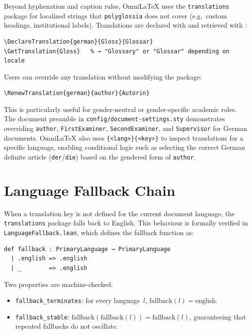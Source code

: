 Beyond hyphenation and caption rules, OmniLaTeX uses the \texttt{translations}
package for localized strings that \texttt{polyglossia} does not cover
(e.g.\ custom headings, institutional labels).  Translations are declared
with  and retrieved with :

\begin{verbatim}
\DeclareTranslation{german}{Gloss}{Glossar}
\GetTranslation{Gloss}   % → "Glossary" or "Glossar" depending on locale
\end{verbatim}

Users can override any translation without modifying the package:

\begin{verbatim}
\RenewTranslation{german}{author}{Autorin}
\end{verbatim}

This is particularly useful for gender-neutral or gender-specific academic
roles.  The document preamble in \texttt{config/document-settings.sty}
demonstrates overriding \texttt{author}, \texttt{FirstExaminer},
\texttt{SecondExaminer}, and \texttt{Supervisor} for German documents.
OmniLaTeX also uses \texttt{\{<lang>\}\{<key>\}} to
inspect translations for a specific language, enabling conditional logic such
as selecting the correct German definite article (\texttt{der}/\texttt{die})
based on the gendered form of \texttt{author}.

\section{Language Fallback Chain}

When a translation key is not defined for the current document language,
the \texttt{translations} package falls back to English.  This behaviour is
formally verified in \texttt{LanguageFallback.lean}, which defines the
fallback function as:

\begin{verbatim}
def fallback : PrimaryLanguage → PrimaryLanguage
  | .english => .english
  | _        => .english
\end{verbatim}

Two properties are machine-checked:
\begin{itemize}
  \item \texttt{fallback\_terminates}: for every language~$l$,
    $\text{fallback}(l) = \text{english}$.
  \item \texttt{fallback\_stable}:
    $\text{fallback}(\text{fallback}(l)) = \text{fallback}(l)$,
    guaranteeing that repeated fallbacks do not oscillate.
\end{itemize}

